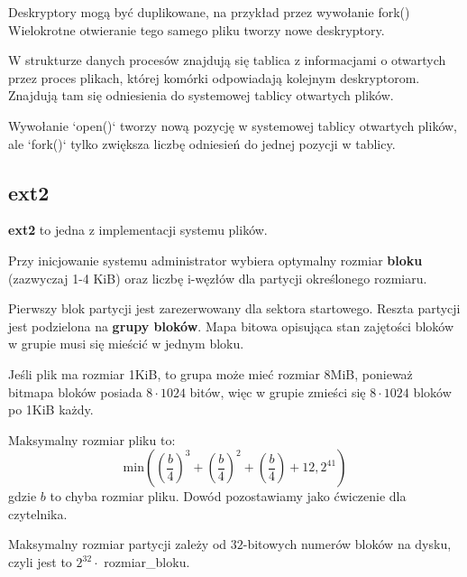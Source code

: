 Deskryptory mogą być duplikowane, na przykład przez wywołanie {\ttfamily fork()}
Wielokrotne otwieranie tego samego pliku tworzy nowe deskryptory.

W strukturze danych procesów znajdują się tablica z informacjami o otwartych przez proces plikach, której komórki odpowiadają kolejnym deskryptorom. Znajdują tam się odniesienia do systemowej tablicy otwartych plików. 

Wywołanie `open()` tworzy nową pozycję w systemowej tablicy otwartych plików, ale `fork()` tylko zwiększa liczbę odniesień do jednej pozycji w tablicy.

\subsection{ext2}

\textbf{ext2} to jedna z implementacji systemu plików. 

Przy inicjowanie systemu administrator wybiera optymalny rozmiar \textbf{bloku} (zazwyczaj 1-4 KiB) oraz liczbę i-węzłów dla partycji określonego rozmiaru. 

Pierwszy blok partycji jest zarezerwowany dla sektora startowego. Reszta partycji jest podzielona na \textbf{grupy bloków}. Mapa bitowa opisująca stan zajętości bloków w grupie musi się mieścić w jednym bloku.

\begin{example}
    Jeśli plik ma rozmiar 1KiB, to grupa może mieć rozmiar 8MiB, ponieważ bitmapa bloków posiada $8 \cdot 1024$
    bitów, więc w grupie zmieści się $8 \cdot 1024$ bloków po 1KiB każdy.
\end{example}

Maksymalny rozmiar pliku to:
$$\text{min} \left( 
    \left( \frac{b}{4} \right)^3 +
    \left( \frac{b}{4} \right)^2 +
    \left( \frac{b}{4} \right) + 12, 2^{41} \right)
$$
gdzie $b$ to chyba rozmiar pliku. Dowód pozostawiamy jako ćwiczenie dla czytelnika.

Maksymalny rozmiar partycji zależy od $32$-bitowych numerów bloków na dysku, czyli jest to $2^{32} \cdot$ {\ttfamily rozmiar\_bloku}.

